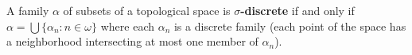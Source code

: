 A family $\alpha$ of subsets of a topological space is \textbf{$\sigma$-discrete} if and only if $\alpha = \bigcup \{\alpha_n : n \in \omega\}$ where each $\alpha_n$ is a discrete family (each point of the space has a neighborhood intersecting at most one member of $\alpha_n$).
